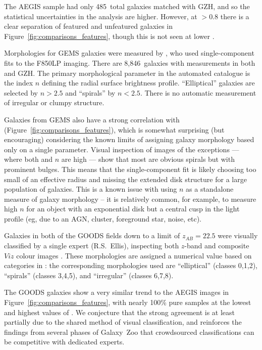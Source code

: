 \documentclass[a4paper,fleqn,usenatbib]{mnras}
\begin{document}
The AEGIS sample had only 485~total galaxies matched with GZH, and so the
statistical uncertainties in the analysis are higher. However, at \fbest$>0.8$
there is a clear separation of featured and unfeatured galaxies in
Figure~\ref{fig:comparisons_features}, though this is not seen at lower \fbest.

Morphologies for GEMS galaxies were measured by \citet{hau07}, who used
single-component \sersic{} fits to the F850LP imaging. There are 8,846~galaxies
with measurements in both \citet{hau07} and GZH. The primary morphological
parameter in the automated catalogue is the \sersic{} index $n$ defining the
radial surface brightness profile.  ``Elliptical'' galaxies are selected by
$n>2.5$ and ``spirals''  by $n<2.5$.  There is no automatic measurement of
irregular or clumpy structure. 

Galaxies from GEMS also have a strong correlation with \fbest{}
(Figure~\ref{fig:comparisons_features}), which is somewhat surprising (but
encouraging) considering the known limits of assigning galaxy morphology based
only on a single \sersic{} parameter.  Visual inspection of images of the
exceptions --- where both \fbest{} and $n$ are high --- show that most are
obvious spirals but with prominent bulges. This means that the single-component
\sersic{} fit is likely choosing too small of an effective radius and missing
the extended disk structure for a large population of galaxies. This is a known
issue with using $n$ as a standalone measure of galaxy morphology -- it is
relatively common, for example, to measure high $n$ for an object with an
exponential disk but a central cusp in the light profile (eg, due to an AGN,
cluster, foreground star, noise, etc).

Galaxies in both of the GOODS fields down to a limit of $z_{AB}=22.5$ were
visually classified by a single expert (R.S.~Ellis), inspecting both $z$-band
and composite $Viz$ colour images \citep{bun05}. These morphologies are assigned
a numerical value based on categories in \citet{bri98a}: the corresponding
morphologies used are ``elliptical'' (classes 0,1,2), ``spirals'' (classes
3,4,5), and ``irregular'' (classes 6,7,8).

The GOODS galaxies show a very similar trend to the AEGIS images in
Figure~\ref{fig:comparisons_features}, with nearly 100\% pure samples at the
lowest and highest values of \fbest. We conjecture that the strong agreement
is at least partially due to the shared method of visual classification,
and reinforces the findings from several phases of Galaxy~Zoo that crowdsourced
classifications can be competitive with dedicated experts.
\end{document}
